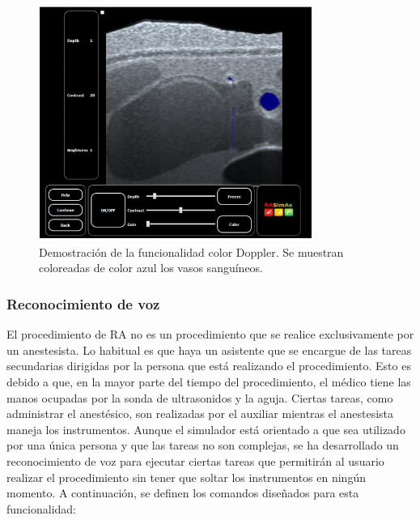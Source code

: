 \begin{figure}[ht]
    \centering
    \includegraphics[width=0.8\textwidth]{IMG/uscolor.PNG}
    \caption{Demostración de la funcionalidad color Doppler. Se muestran coloreadas de color azul los vasos sanguíneos.}
    \label{fig:doppler}
\end{figure}
 
\subsubsection{Reconocimiento de voz}

El procedimiento de \ac{RA} no es un procedimiento que se realice exclusivamente por un anestesista. Lo habitual es que haya un asistente que se encargue de las tareas secundarias dirigidas por la persona que está realizando el procedimiento. Esto es debido a que, en la mayor parte del tiempo del procedimiento, el médico tiene las manos ocupadas por la sonda de ultrasonidos y la aguja. Ciertas tareas, como administrar el anestésico, son realizadas por el auxiliar mientras el anestesista maneja los instrumentos. Aunque el simulador está orientado a que sea utilizado por una única persona y que las tareas no son complejas, se ha desarrollado un reconocimiento de voz para ejecutar ciertas tareas que permitirán al usuario realizar el procedimiento sin tener que soltar los instrumentos en ningún momento. A continuación, se definen los comandos diseñados para esta funcionalidad:

